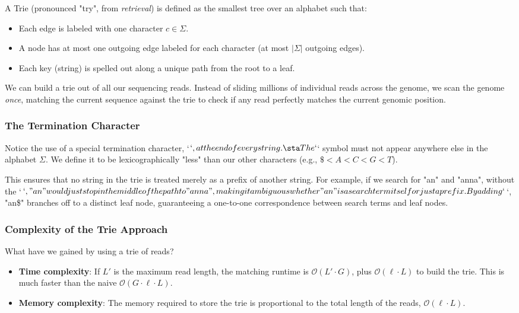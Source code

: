 A Trie (pronounced "try", from \textit{retrieval}) is defined as the smallest tree over an alphabet such that:
\begin{itemize}
    \item Each edge is labeled with one character $c \in \Sigma$.
    \item A node has at most one outgoing edge labeled for each character (at most $|\Sigma|$ outgoing edges).
    \item Each key (string) is spelled out along a unique path from the root to a leaf.
\end{itemize}

We can build a trie out of all our sequencing reads. Instead of sliding millions of individual reads across the genome, we scan the genome \textit{once}, matching the current sequence against the trie to check if any read perfectly matches the current genomic position.


\subsubsection{The Termination Character}

Notice the use of a special termination character, `$`, at the end of every string.

\sta The `$` symbol must not appear anywhere else in the alphabet $\Sigma$. We define it to be lexicographically "less" than our other characters (e.g., $\$ < A < C < G < T$).

This ensures that no string in the trie is treated merely as a prefix of another string. For example, if we search for "an" and "anna", without the `$`, "an" would just stop in the middle of the path to "anna", making it ambiguous whether "an" is a search term itself or just a prefix. By adding `$`, "an\$" branches off to a distinct leaf node, guaranteeing a one-to-one correspondence between search terms and leaf nodes.

\subsubsection{Complexity of the Trie Approach}

What have we gained by using a trie of reads?
\begin{itemize}
    \item \textbf{Time complexity}: If $L'$ is the maximum read length, the matching runtime is $\mathcal{O}(L' \cdot G)$, plus $\mathcal{O}(\ell \cdot L)$ to build the trie. This is much faster than the naive $\mathcal{O}(G \cdot \ell \cdot L)$.
    \item \textbf{Memory complexity}: The memory required to store the trie is proportional to the total length of the reads, $\mathcal{O}(\ell \cdot L)$. 
\end{itemize}

